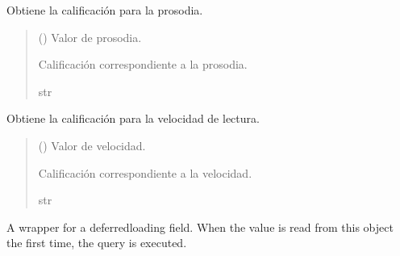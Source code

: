 \documentclass[letterpaper,10pt,spanish]{sphinxmanual}
\begin{document}
\begin{fulllineitems}
\begin{fulllineitems}
\pysigstartsignatures
{}
\pysigstopsignatures
\sphinxAtStartPar
Obtiene la calificación para la prosodia.
\begin{quote}\begin{description}
\sphinxAtStartPar
{} () \textendash{} Valor de prosodia.

\sphinxAtStartPar
Calificación correspondiente a la prosodia.

\sphinxAtStartPar
str

\end{description}\end{quote}

\end{fulllineitems}



\begin{fulllineitems}

\pysigstartsignatures
{}
\pysigstopsignatures
\sphinxAtStartPar
Obtiene la calificación para la velocidad de lectura.
\begin{quote}\begin{description}
\sphinxAtStartPar
{} () \textendash{} Valor de velocidad.

\sphinxAtStartPar
Calificación correspondiente a la velocidad.

\sphinxAtStartPar
str

\end{description}\end{quote}

\end{fulllineitems}



\begin{fulllineitems}

\pysigstartsignatures
{}
\pysigstopsignatures
\sphinxAtStartPar
A wrapper for a deferred\sphinxhyphen{}loading field. When the value is read from this
object the first time, the query is executed.


\end{fulllineitems}
\end{fulllineitems}
\end{document}
